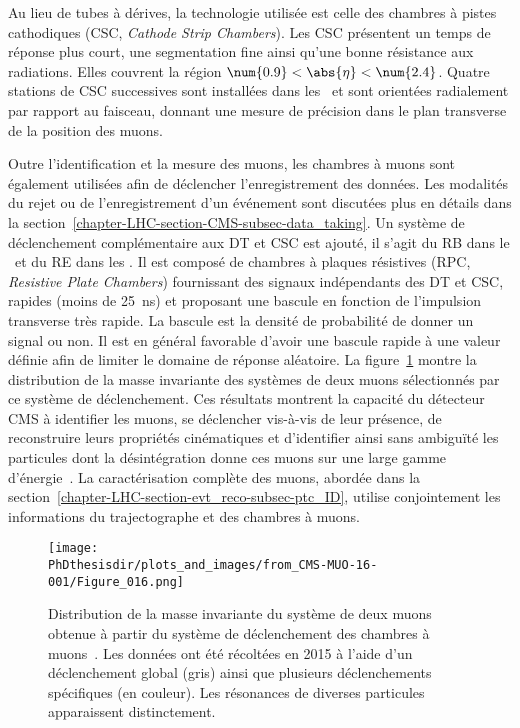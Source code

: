 Au lieu de tubes à dérives, la technologie utilisée est celle des chambres à pistes cathodiques (CSC, \emph{Cathode Strip Chambers}).
Les CSC présentent un temps de réponse plus court, une segmentation fine ainsi qu'une bonne résistance aux radiations.
Elles couvrent la région $\num{0.9}<\abs{\eta}<\num{2.4}$.
Quatre stations de CSC successives sont installées dans les \CMSendcaps\ et sont orientées radialement par rapport au faisceau, donnant une mesure de précision dans le plan transverse de la position des muons.
\par Outre l'identification et la mesure des muons, les chambres à muons sont également utilisées afin de déclencher l'enregistrement des données.
Les modalités du rejet ou de l'enregistrement d'un événement sont discutées plus en détails dans la section~\ref{chapter-LHC-section-CMS-subsec-data_taking}.
Un système de déclenchement complémentaire aux DT et CSC est ajouté, il s'agit du RB dans le \CMSbarrel\ et du RE dans les \CMSendcaps.
Il est composé de chambres à plaques résistives (RPC, \emph{Resistive Plate Chambers}) fournissant des signaux indépendants des DT et CSC, rapides (moins de \SI{25}{\nano\second}) et proposant une bascule en fonction de l'impulsion transverse très rapide.
La bascule est la densité de probabilité de donner un signal ou non. Il est en général favorable d'avoir une bascule rapide à une valeur définie afin de limiter le domaine de réponse aléatoire.
La figure~\ref{fig-chapter-LHC-section-CMS-subsec-muons-CMS-MUO-16-001-Figure_016} montre la distribution de la masse invariante des systèmes de deux muons sélectionnés par ce système de déclenchement.
Ces résultats montrent la capacité du détecteur CMS à identifier les muons, se déclencher vis-à-vis de leur présence, de reconstruire leurs propriétés cinématiques et d'identifier ainsi sans ambiguïté les particules dont la désintégration donne ces muons sur une large gamme d'énergie~\cite{CMS-MUO-16-001}.
La caractérisation complète des muons, abordée dans la section~\ref{chapter-LHC-section-evt_reco-subsec-ptc_ID}, utilise conjointement les informations du trajectographe et des chambres à muons.
\begin{figure}[h]
\centering
\texttt{[image: \\PhDthesisdir/plots\_and\_images/from\_CMS-MUO-16-001/Figure\_016.png]}
\caption[Distribution de la masse invariante de deux muons.]{Distribution de la masse invariante du système de deux muons obtenue à partir du système de déclenchement des chambres à muons~\cite{CMS-MUO-16-001}. Les données ont été récoltées en 2015 à l'aide d'un déclenchement global (gris) ainsi que plusieurs déclenchements spécifiques (en couleur). Les résonances de diverses particules apparaissent distinctement.}
\label{fig-chapter-LHC-section-CMS-subsec-muons-CMS-MUO-16-001-Figure_016}
\end{figure}